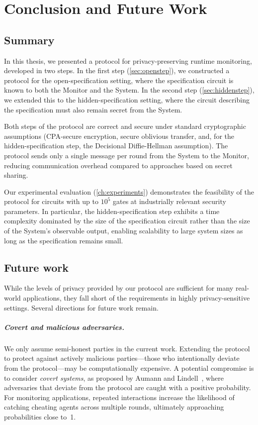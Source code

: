 \chapter{Conclusion and Future Work}\label{ch:conclusion}

\section{Summary}

In this thesis, we presented a protocol for privacy-preserving runtime monitoring, developed in two steps. In the first step (\cref{sec:openstep}), we constructed a protocol for the open-specification setting, where the specification circuit is known to both the Monitor and the System. In the second step (\cref{sec:hiddenstep}), we extended this to the hidden-specification setting, where the circuit describing the specification must also remain secret from the System.

Both steps of the protocol are correct and secure under standard cryptographic assumptions (CPA-secure encryption, secure oblivious transfer, and, for the hidden-specification step, the Decisional Diffie-Hellman assumption). The protocol sends only a single message per round from the System to the Monitor, reducing communication overhead compared to approaches based on secret sharing.

Our experimental evaluation (\cref{ch:experiments}) demonstrates the feasibility of the protocol for circuits with up to $10^5$ gates at industrially relevant security parameters. In particular, the hidden-specification step exhibits a time complexity dominated by the size of the specification circuit rather than the size of the System's observable output, enabling scalability to large system sizes as long as the specification remains small.

\section{Future work}

While the levels of privacy provided by our protocol are sufficient for many real-world applications, they fall short of the requirements in highly privacy-sensitive settings. Several directions for future work remain.

\paragraph{Covert and malicious adversaries.}
We only assume semi-honest parties in the current work. Extending the protocol to protect against actively malicious parties---those who intentionally deviate from the protocol---may be computationally expensive. A potential compromise is to consider \emph{covert systems}, as proposed by Aumann and Lindell~\cite{AL10}, where adversaries that deviate from the protocol are caught with a positive probability. For monitoring applications, repeated interactions increase the likelihood of catching cheating agents across multiple rounds, ultimately approaching probabilities close to~1.

